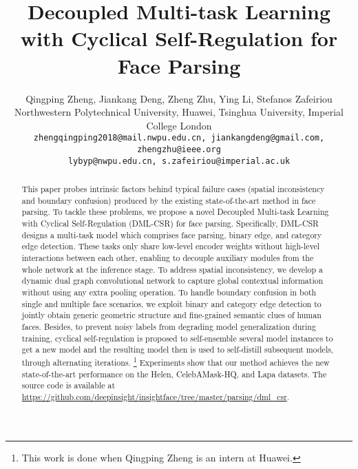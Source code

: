 \documentclass[10pt,twocolumn,letterpaper]{article}
\renewcommand\thefootnote{}
\begin{document}
\title{Decoupled Multi-task Learning with Cyclical Self-Regulation for Face Parsing}

\author{Qingping Zheng, Jiankang Deng, Zheng Zhu, Ying Li, Stefanos Zafeiriou\\
\small Northwestern Polytechnical University,  Huawei, Tsinghua University, Imperial College London\\
{\tt\small zhengqingping2018@mail.nwpu.edu.cn, jiankangdeng@gmail.com, zhengzhu@ieee.org} \\
{\tt\small lybyp@nwpu.edu.cn, s.zafeiriou@imperial.ac.uk}
}
\maketitle

\begin{abstract}

This paper probes intrinsic factors behind typical failure cases (\eg spatial inconsistency and boundary confusion) produced by the existing state-of-the-art method in face parsing. To tackle these problems, we propose a novel Decoupled Multi-task Learning with Cyclical Self-Regulation (DML-CSR) for face parsing. Specifically, DML-CSR designs a multi-task model which comprises face parsing, binary edge, and category edge detection. 
These tasks only share low-level encoder weights without high-level interactions between each other, enabling to decouple auxiliary modules from the whole network at the inference stage.
To address spatial inconsistency, we develop a dynamic dual graph convolutional network to capture global contextual information without using any extra pooling operation.
To handle boundary confusion in both single and multiple face scenarios, we exploit binary and category edge detection to jointly obtain generic geometric structure and fine-grained semantic clues of human faces.
Besides, to prevent noisy labels from degrading model generalization during training, cyclical self-regulation is proposed to self-ensemble several model instances to get a new model and the resulting model then is used to self-distill subsequent models, through alternating iterations.
\footnote{This work is done when Qingping Zheng is an intern at Huawei.} 
\setcounter{footnote}{0}
\renewcommand\thefootnote{\arabic{footnote}}
Experiments show that our method achieves the new state-of-the-art performance on the Helen, CelebAMask-HQ, and Lapa datasets. 
The source code is available at \url{https://github.com/deepinsight/insightface/tree/master/parsing/dml_csr}.
\end{abstract}
\end{document}
